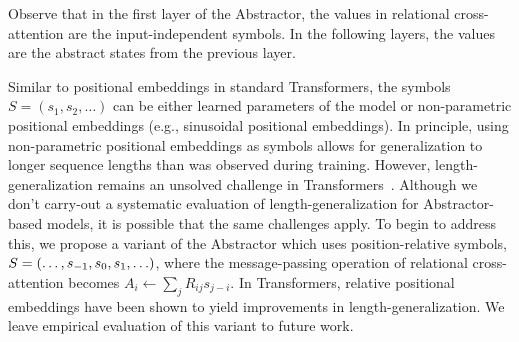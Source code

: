 Observe that in the first layer of the Abstractor, the values in relational cross-attention are the input-independent symbols. In the following layers, the values are the abstract states from the previous layer. %

\begin{remark*}\rm
    Similar to positional embeddings in standard Transformers, the symbols $S = (s_1, s_2, \ldots)$ can be either learned parameters of the model or non-parametric positional embeddings (e.g., sinusoidal positional embeddings). In principle, using non-parametric positional embeddings as symbols allows for generalization to longer sequence lengths than was observed during training. However, length-generalization remains an unsolved challenge in Transformers~\citep{kazemnejadImpactPositionalEncoding2023}. Although we don't carry-out a systematic evaluation of length-generalization for Abstractor-based models, it is possible that the same challenges apply. To begin to address this, we propose a variant of the Abstractor which uses position-relative symbols, $S = \left(\ldots, s_{-1}, s_0, s_1, \ldots\right)$, where the message-passing operation of relational cross-attention becomes $A_i \gets \sum_{j} R_{ij} s_{j-i}$.
    In Transformers, relative positional embeddings have been shown to yield improvements in length-generalization. We leave empirical evaluation of this variant to future work.
\end{remark*}

%